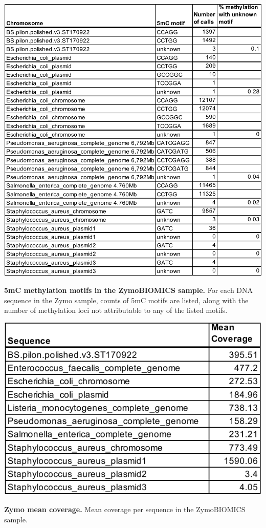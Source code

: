 \begin{table}[!hb]
\centering
\includegraphics[width = 1\linewidth,keepaspectratio]{figure/bisulf.pdf}
\caption[5mC methylation motifs in the ZymoBIOMICS sample]{{\bf 5mC methylation motifs in the ZymoBIOMICS sample.} For each DNA sequence in the Zymo sample, counts of 5mC motifs are listed, along with the number of methylation loci not attributable to any of the listed motifs. }
\label{tab:bisulf}
\end{table}


\begin{table}[!hb]
\centering
\includegraphics[width = .5\linewidth,keepaspectratio]{figure/meancov.pdf}
\caption[Zymo mean coverage]{{\bf Zymo mean coverage.} Mean coverage per sequence in the ZymoBIOMICS sample. }
\label{tab:meancov}
\end{table}


